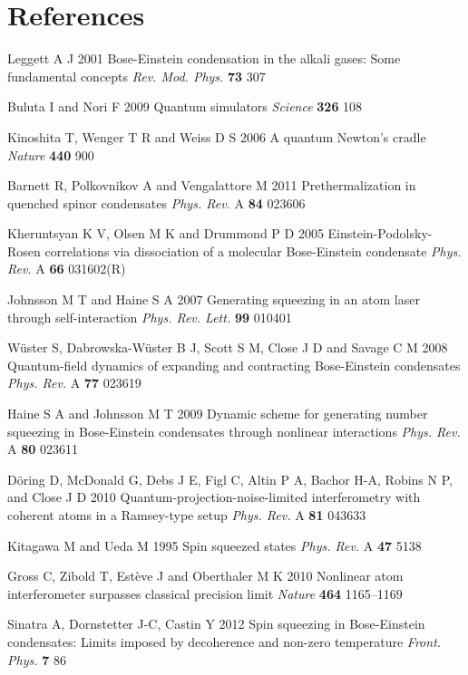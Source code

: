 \documentclass{iopart}
\begin{document}
\section*{References}
\begin{thebibliography}{10}

 Leggett A J 2001 Bose-Einstein condensation in the alkali gases: Some fundamental concepts \emph{Rev. Mod. Phys.} {\bf 73} 307 

 Buluta I and Nori F 2009 Quantum simulators \emph{Science} {\bf 326} 108

 Kinoshita T, Wenger T R and Weiss D S 2006 A quantum Newton's cradle \emph{Nature} {\bf 440} 900

 Barnett R, Polkovnikov A and Vengalattore M 2011 Prethermalization in quenched spinor condensates \emph{Phys. Rev.} A {\bf 84} 023606

 Kheruntsyan K V, Olsen M K and Drummond P D 2005 Einstein-Podolsky-Rosen correlations via dissociation of a molecular Bose-Einstein condensate \emph{Phys. Rev.} A {\bf 66} 031602(R)

 Johnsson M T and Haine S A 2007 Generating squeezing in an atom laser through self-interaction \emph{Phys. Rev. Lett.} {\bf 99} 010401

 W{\"{u}}ster S, Dabrowska-W{\"{u}}ster B J, Scott S M, Close J D and Savage C M 2008
 Quantum-field dynamics of expanding and contracting Bose-Einstein condensates \emph{Phys. Rev.} A {\bf 77} 023619

 Haine S A and Johnsson M T 2009 Dynamic scheme for generating number squeezing in Bose-Einstein condensates through nonlinear interactions \emph{Phys. Rev.} A {\bf 80} 023611

 D{\"{o}}ring D, McDonald G, Debs J E, Figl C, Altin P A, Bachor H-A, Robins N P, and Close J D 2010 Quantum-projection-noise-limited interferometry with coherent atoms in a Ramsey-type setup \emph{Phys. Rev.} A {\bf 81} 043633

 Kitagawa M and Ueda M 1995 Spin squeezed states \emph{Phys. Rev.} A {\bf 47} 5138

 Gross C, Zibold T, Est{\`{e}}ve J and Oberthaler M K 2010 Nonlinear atom interferometer surpasses classical precision limit \emph{Nature} {\bf 464} 1165--1169

 Sinatra A, Dornstetter J-C, Castin Y 2012 Spin squeezing in Bose-Einstein condensates: Limits imposed by decoherence and non-zero temperature \emph{Front. Phys.} {\bf 7} 86


\end{thebibliography}
\end{document}
